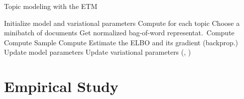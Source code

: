 \documentclass[11pt,a4paper]{article}
\begin{document}
\begin{algorithm}[t]
  \caption{Topic modeling with the \gls{ETM}}
  \label{alg:etm}
  \small
  \begin{algorithmic}
    \STATE Initialize model and variational parameters
    \STATE Compute  for each topic 
    \STATE Choose a minibatch  of documents
    \STATE Get normalized bag-of-word representat.\ 
    \STATE Compute 
    \STATE Compute 
                \STATE Sample 
    \STATE Compute 
    \ENDFOR
    \ENDFOR
    \STATE Estimate the \acrshort{ELBO} and its gradient (backprop.)
    \STATE Update model parameters 
    \STATE Update variational parameters (, )
    \ENDFOR
  \end{algorithmic}
\end{algorithm}

 
 
\section{Empirical Study}
\label{sec:experiments}
\end{document}
